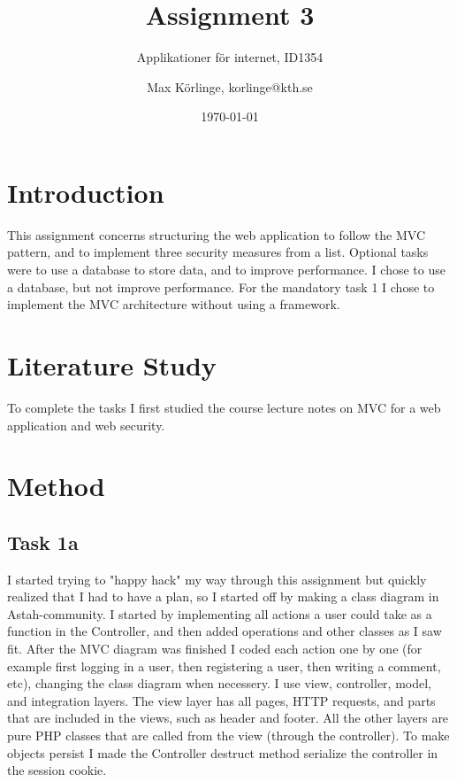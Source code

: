 \documentclass[a4paper]{scrreprt}
\title{Assignment 3}
\subtitle{Applikationer för internet, ID1354}
\author{Max Körlinge, korlinge@kth.se}
\date{\today}
\begin{document}
\maketitle

\tableofcontents %
\clearpage

\chapter{Introduction}

This assignment concerns structuring the web application to follow the MVC pattern, and to implement three security measures from a list. Optional tasks were to use a database to store data, and to improve performance. I chose to use a database, but not improve performance. For the mandatory task 1 I chose to implement the MVC architecture without using a framework.

\chapter{Literature Study}

To complete the tasks I first studied the course lecture notes on MVC for a web application and web security.

\chapter{Method}

\section{Task 1a}
I started trying to "happy hack" my way through this assignment but quickly realized that I had to have a plan, so I started off by making a class diagram in Astah-community. I started by implementing all actions a user could take as a function in the Controller, and then added operations and other classes as I saw fit. After the MVC diagram was finished I coded each action one by one (for example first logging in a user, then registering a user, then writing a comment, etc), changing the class diagram when necessery. I use view, controller, model, and integration layers. The view layer has all pages, HTTP requests, and parts that are included in the views, such as header and footer. All the other layers are pure PHP classes that are called from the view (through the controller). To make objects persist I made the Controller destruct method serialize the controller in the session cookie.
\end{document}
